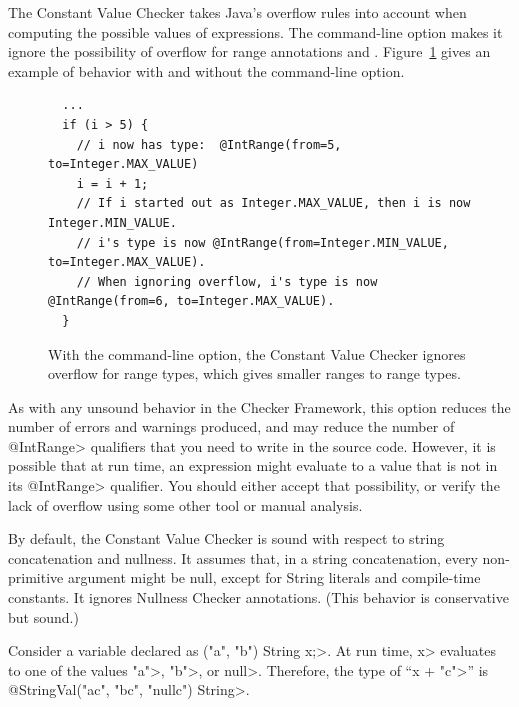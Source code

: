 
The Constant Value Checker takes Java's overflow rules into account when
computing the possible values of expressions.
%
The  command-line option makes it ignore the
possibility of overflow for range annotations
 and
.
%
Figure~\ref{fig-value-ignore-overflow} gives an example of behavior with
and without the  command-line option.

\begin{figure}
\begin{Verbatim}
  ...
  if (i > 5) {
    // i now has type:  @IntRange(from=5, to=Integer.MAX_VALUE)
    i = i + 1;
    // If i started out as Integer.MAX_VALUE, then i is now Integer.MIN_VALUE.
    // i's type is now @IntRange(from=Integer.MIN_VALUE, to=Integer.MAX_VALUE).
    // When ignoring overflow, i's type is now @IntRange(from=6, to=Integer.MAX_VALUE).
  }
\end{Verbatim}
\caption{With the  command-line option,
the Constant Value Checker ignores overflow
for range types, which gives smaller ranges to range types.}
\label{fig-value-ignore-overflow}
\end{figure}

As with any unsound behavior in the Checker Framework, this option reduces
the number of errors and warnings produced, and may reduce the number of
\<@IntRange> qualifiers that you need to write in the source code.
However, it is possible that at run time, an expression might evaluate to a
value that is not in its \<@IntRange> qualifier.  You should either accept
that possibility, or verify the lack of overflow using some other tool or
manual analysis.



By default, the Constant Value Checker is sound with respect to string
concatenation and nullness.  It assumes that, in a string concatenation,
every non-primitive argument might be null, except for String literals
and compile-time constants. It ignores Nullness Checker annotations.
(This behavior is conservative but sound.)

Consider a variable declared as
\<("a", "b") String x;>.
At run time, \<x> evaluates to one of the values \<"a">, \<"b">, or
\<null>.
Therefore, the type of ``\<x + "c">'' is
\<@StringVal("ac", "bc", "nullc") String>.

